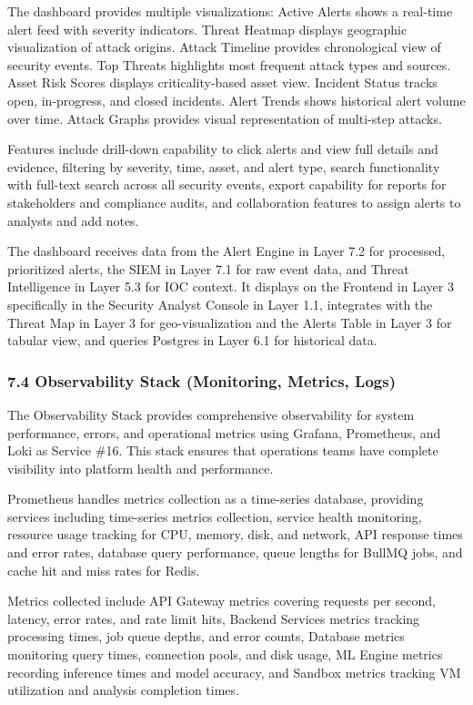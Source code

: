 \documentclass[12pt,a4paper]{report}
\begin{document}
The dashboard provides multiple visualizations: Active Alerts shows a real-time alert feed with severity indicators. Threat Heatmap displays geographic visualization of attack origins. Attack Timeline provides chronological view of security events. Top Threats highlights most frequent attack types and sources. Asset Risk Scores displays criticality-based asset view. Incident Status tracks open, in-progress, and closed incidents. Alert Trends shows historical alert volume over time. Attack Graphs provides visual representation of multi-step attacks.

Features include drill-down capability to click alerts and view full details and evidence, filtering by severity, time, asset, and alert type, search functionality with full-text search across all security events, export capability for reports for stakeholders and compliance audits, and collaboration features to assign alerts to analysts and add notes.

The dashboard receives data from the Alert Engine in Layer 7.2 for processed, prioritized alerts, the SIEM in Layer 7.1 for raw event data, and Threat Intelligence in Layer 5.3 for IOC context. It displays on the Frontend in Layer 3 specifically in the Security Analyst Console in Layer 1.1, integrates with the Threat Map in Layer 3 for geo-visualization and the Alerts Table in Layer 3 for tabular view, and queries Postgres in Layer 6.1 for historical data.

\subsubsection{7.4 Observability Stack (Monitoring, Metrics, Logs)}

The Observability Stack provides comprehensive observability for system performance, errors, and operational metrics using Grafana, Prometheus, and Loki as Service \#16. This stack ensures that operations teams have complete visibility into platform health and performance.

Prometheus handles metrics collection as a time-series database, providing services including time-series metrics collection, service health monitoring, resource usage tracking for CPU, memory, disk, and network, API response times and error rates, database query performance, queue lengths for BullMQ jobs, and cache hit and miss rates for Redis.

Metrics collected include API Gateway metrics covering requests per second, latency, error rates, and rate limit hits, Backend Services metrics tracking processing times, job queue depths, and error counts, Database metrics monitoring query times, connection pools, and disk usage, ML Engine metrics recording inference times and model accuracy, and Sandbox metrics tracking VM utilization and analysis completion times.
\end{document}
